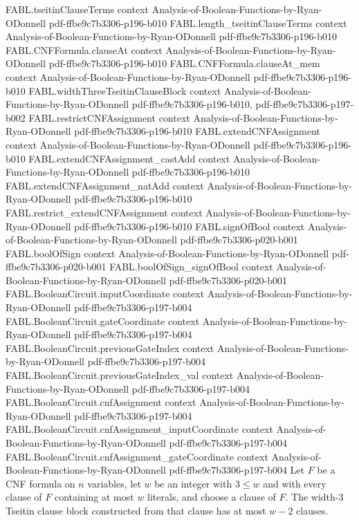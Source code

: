 \begin{theorem}
\proofstep
  {FABL.tseitinClauseTerms}
  {context}
  {Analysis-of-Boolean-Functions-by-Ryan-ODonnell}
  {pdf-ffbe9c7b3306-p196-b010}
\proofstep
  {FABL.length_tseitinClauseTerms}
  {context}
  {Analysis-of-Boolean-Functions-by-Ryan-ODonnell}
  {pdf-ffbe9c7b3306-p196-b010}
\proofstep
  {FABL.CNFFormula.clauseAt}
  {context}
  {Analysis-of-Boolean-Functions-by-Ryan-ODonnell}
  {pdf-ffbe9c7b3306-p196-b010}
\proofstep
  {FABL.CNFFormula.clauseAt_mem}
  {context}
  {Analysis-of-Boolean-Functions-by-Ryan-ODonnell}
  {pdf-ffbe9c7b3306-p196-b010}
\proofstep
  {FABL.widthThreeTseitinClauseBlock}
  {context}
  {Analysis-of-Boolean-Functions-by-Ryan-ODonnell}
  {pdf-ffbe9c7b3306-p196-b010,
    pdf-ffbe9c7b3306-p197-b002}
\proofstep
  {FABL.restrictCNFAssignment}
  {context}
  {Analysis-of-Boolean-Functions-by-Ryan-ODonnell}
  {pdf-ffbe9c7b3306-p196-b010}
\proofstep
  {FABL.extendCNFAssignment}
  {context}
  {Analysis-of-Boolean-Functions-by-Ryan-ODonnell}
  {pdf-ffbe9c7b3306-p196-b010}
\proofstep
  {FABL.extendCNFAssignment_castAdd}
  {context}
  {Analysis-of-Boolean-Functions-by-Ryan-ODonnell}
  {pdf-ffbe9c7b3306-p196-b010}
\proofstep
  {FABL.extendCNFAssignment_natAdd}
  {context}
  {Analysis-of-Boolean-Functions-by-Ryan-ODonnell}
  {pdf-ffbe9c7b3306-p196-b010}
\proofstep
  {FABL.restrict_extendCNFAssignment}
  {context}
  {Analysis-of-Boolean-Functions-by-Ryan-ODonnell}
  {pdf-ffbe9c7b3306-p196-b010}
\proofstep
  {FABL.signOfBool}
  {context}
  {Analysis-of-Boolean-Functions-by-Ryan-ODonnell}
  {pdf-ffbe9c7b3306-p020-b001}
\proofstep
  {FABL.boolOfSign}
  {context}
  {Analysis-of-Boolean-Functions-by-Ryan-ODonnell}
  {pdf-ffbe9c7b3306-p020-b001}
\proofstep
  {FABL.boolOfSign_signOfBool}
  {context}
  {Analysis-of-Boolean-Functions-by-Ryan-ODonnell}
  {pdf-ffbe9c7b3306-p020-b001}
\proofstep
  {FABL.BooleanCircuit.inputCoordinate}
  {context}
  {Analysis-of-Boolean-Functions-by-Ryan-ODonnell}
  {pdf-ffbe9c7b3306-p197-b004}
\proofstep
  {FABL.BooleanCircuit.gateCoordinate}
  {context}
  {Analysis-of-Boolean-Functions-by-Ryan-ODonnell}
  {pdf-ffbe9c7b3306-p197-b004}
\proofstep
  {FABL.BooleanCircuit.previousGateIndex}
  {context}
  {Analysis-of-Boolean-Functions-by-Ryan-ODonnell}
  {pdf-ffbe9c7b3306-p197-b004}
\proofstep
  {FABL.BooleanCircuit.previousGateIndex_val}
  {context}
  {Analysis-of-Boolean-Functions-by-Ryan-ODonnell}
  {pdf-ffbe9c7b3306-p197-b004}
\proofstep
  {FABL.BooleanCircuit.cnfAssignment}
  {context}
  {Analysis-of-Boolean-Functions-by-Ryan-ODonnell}
  {pdf-ffbe9c7b3306-p197-b004}
\proofstep
  {FABL.BooleanCircuit.cnfAssignment_inputCoordinate}
  {context}
  {Analysis-of-Boolean-Functions-by-Ryan-ODonnell}
  {pdf-ffbe9c7b3306-p197-b004}
\proofstep
  {FABL.BooleanCircuit.cnfAssignment_gateCoordinate}
  {context}
  {Analysis-of-Boolean-Functions-by-Ryan-ODonnell}
  {pdf-ffbe9c7b3306-p197-b004}
Let $F$ be a CNF formula on $n$ variables, let $w$ be an integer with $3\le w$ and with
every clause of $F$ containing at most $w$ literals, and choose a clause of $F$. The
width-$3$ Tseitin clause block constructed from that clause has at most $w-2$ clauses.
\end{theorem}

